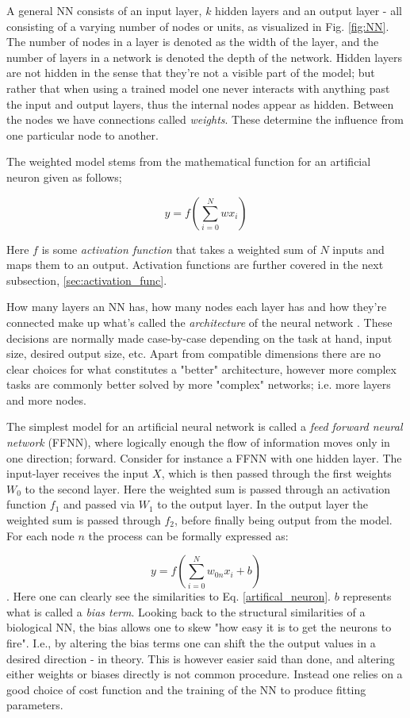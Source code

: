 A general NN consists of an input layer, $k$ hidden layers and an output layer - all consisting of a varying number of nodes or units, as visualized in Fig. \ref{fig:NN}. The number of nodes in a layer is denoted as the width of the layer, and the number of layers in a network is denoted the depth of the network. 
Hidden layers are not hidden in the sense that they're not a visible part of the model; but rather that when using a trained model one never interacts with anything past the input and output layers, thus the internal nodes appear as hidden. 
Between the nodes we have connections called \textit{weights}. These determine the influence from one particular node to another. 

The weighted model stems from the mathematical function for an artificial neuron given as follows; 

\begin{equation}\label{artifical_neuron}
    y = f\left( \sum_{i=0}^Nwx_i \right) 
\end{equation}

Here $f$ is some \textit{activation function} that takes a weighted sum of $N$ inputs and maps them to an output. Activation functions are further covered in the next subsection, \ref{sec:activation_func}.

How many layers an NN has, how many nodes each layer has and how they're connected make up what's called the \textit{architecture} of the neural network \citep[Ch.1]{nielsen}. These decisions are normally made case-by-case depending on the task at hand, input size, desired output size, etc. Apart from compatible dimensions there are no clear choices for what constitutes a "better" architecture, however more complex tasks are commonly better solved by more "complex" networks; i.e. more layers and more nodes. 

The simplest model for an artificial neural network is called a \textit{feed forward neural network} (FFNN), where logically enough the flow of information moves only in one direction; forward. Consider for instance a FFNN with one hidden layer. The input-layer receives the input $X$, which is then passed through the first weights $W_0$ to the second layer. Here the weighted sum is passed through an activation function $f_1$ and passed via $W_1$ to the output layer. In the output layer the weighted sum is passed through $f_2$, before finally being output from the model. 
For each node $n$ the process can be formally expressed as:


\begin{equation}
    y = f\left( \sum_{i=0}^N w_{0n}x_i + b\right)
\end{equation}
\citep[p.17]{Ketkar2017}. Here one can clearly see the similarities to Eq. \ref{artifical_neuron}. $b$ represents what is called a \textit{bias term}. Looking back to the structural similarities of a biological NN, the bias allows one to skew "how easy it is to get the neurons to fire". I.e., by altering the bias terms one can shift the the output values in a desired direction - in theory. This is however easier said than done, and altering either weights or biases directly is not common procedure. Instead one relies on a good choice of cost function and the training of the NN to produce fitting parameters. 


